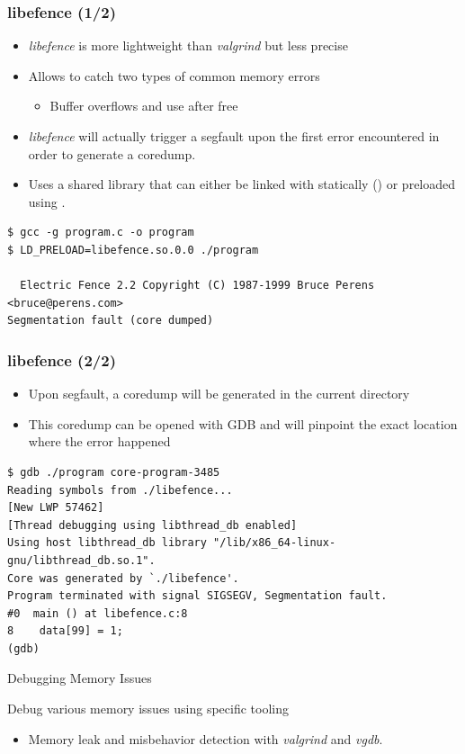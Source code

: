 \begin{frame}[fragile]
  \frametitle{libefence (1/2)}
  \begin{itemize}
    \item {\em libefence} is more lightweight than {\em valgrind} but less precise
    \item Allows to catch two types of common memory errors
    \begin{itemize}
      \item Buffer overflows and use after free
    \end{itemize}
    \item {\em libefence} will actually trigger a segfault upon the first error
          encountered in order to generate a coredump.
    \item Uses a shared library that can either be linked with statically
          () or preloaded using .
  \end{itemize}

  \begin{block}{}
    \begin{verbatim}
$ gcc -g program.c -o program
$ LD_PRELOAD=libefence.so.0.0 ./program

  Electric Fence 2.2 Copyright (C) 1987-1999 Bruce Perens <bruce@perens.com>
Segmentation fault (core dumped)
    \end{verbatim}
  \end{block}

\end{frame}

\begin{frame}[fragile]
  \frametitle{libefence (2/2)}
  \begin{itemize}
    \item Upon segfault, a coredump will be generated in the current directory
    \item This coredump can be opened with GDB and will pinpoint the exact
          location where the error happened
  \end{itemize}
  \begin{block}{}
    \begin{verbatim}
$ gdb ./program core-program-3485
Reading symbols from ./libefence...
[New LWP 57462]
[Thread debugging using libthread_db enabled]
Using host libthread_db library "/lib/x86_64-linux-gnu/libthread_db.so.1".
Core was generated by `./libefence'.
Program terminated with signal SIGSEGV, Segmentation fault.
#0  main () at libefence.c:8
8    data[99] = 1;
(gdb) 
    \end{verbatim}
  \end{block}
\end{frame}

\setuplabframe
{Debugging Memory Issues}
{
  Debug various memory issues using specific tooling
  \begin{itemize}
    \item Memory leak and misbehavior detection with {\em valgrind} and
            {\em vgdb}.
  \end{itemize}
}
